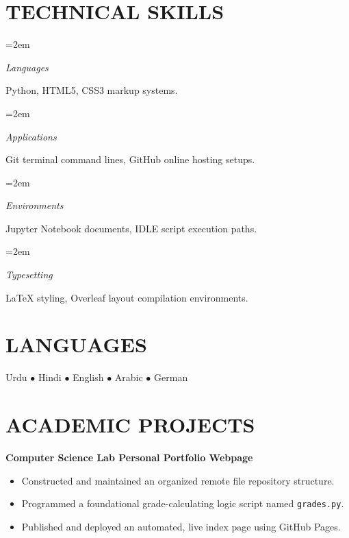 \documentclass[paper=a4,fontsize=10.5pt]{scrartcl}
\newlength{\spacebox}
\newcommand{\sepspace}{\vspace*{0.2em}}
\newcommand{\SkillsEntry}[2]{      
		\noindent\hangindent=2em\hangafter=0 
		\parbox{\spacebox}{         
		\textit{#1}}               
		\hspace{1.5em} #2 \par}
\newcommand{\NewPart}[1]{\section*{\uppercase{#1}}}
\begin{document}
\sepspace

\NewPart{Technical Skills}

\SkillsEntry{Languages}{Python, HTML5, CSS3 markup systems.}
\SkillsEntry{Applications}{Git terminal command lines, GitHub online hosting setups.}
\SkillsEntry{Environments}{Jupyter Notebook documents, IDLE script execution paths.}
\SkillsEntry{Typesetting}{LaTeX styling, Overleaf layout compilation environments.}

\sepspace

\NewPart{Languages}
\noindent Urdu \quad $\bullet$ \quad Hindi \quad $\bullet$ \quad English \quad $\bullet$ \quad Arabic \quad $\bullet$ \quad German

\sepspace

\NewPart{Academic Projects}

\textbf{Computer Science Lab Personal Portfolio Webpage} 
\begin{itemize}
    \item Constructed and maintained an organized remote file repository structure.
    \item Programmed a foundational grade-calculating logic script named \texttt{grades.py}.
    \item Published and deployed an automated, live index page using GitHub Pages.
\end{itemize}
\end{document}
